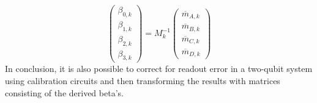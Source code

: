 \begin{equation}
\begin{pmatrix}
\beta_{0,k} \\
\beta_{1,k} \\
\beta_{2,k} \\
\beta_{3,k}
\end{pmatrix}=M_k^{-1}
\begin{pmatrix}
\overline{m}_{A,k} \\
\overline{m}_{B,k} \\
\overline{m}_{C,k} \\
\overline{m}_{D,k}
\end{pmatrix}
\end{equation}
In conclusion, it is also possible to correct for readout error in a two-qubit system using calibration circuits and then transforming the results with matrices consisting of the derived beta's.




 